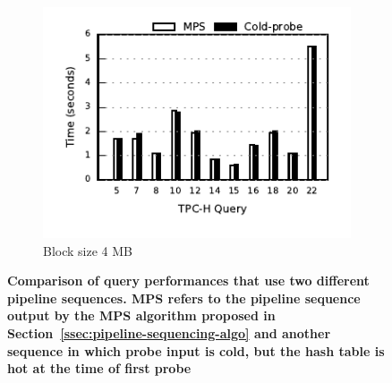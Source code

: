 \begin{figure}[ht]
\begin{subfigure}[ht]{0.3\textwidth}
		\includegraphics[width=\textwidth]{pipeline/figures/coldprobe-sequence-20threads-tpch-sf50-bs4mb-withlip-colstore}	
		\caption{Block size 4 MB}
	\end{subfigure}
	\caption{\textbf{Comparison of query performances that use two different pipeline sequences. MPS refers to the pipeline sequence output by the MPS algorithm proposed in Section~\ref{ssec:pipeline-sequencing-algo} and another sequence in which probe input is cold, but the hash table is hot at the time of first probe}}
	\label{fig:pipeline-sequence-comparison}
\end{figure}

